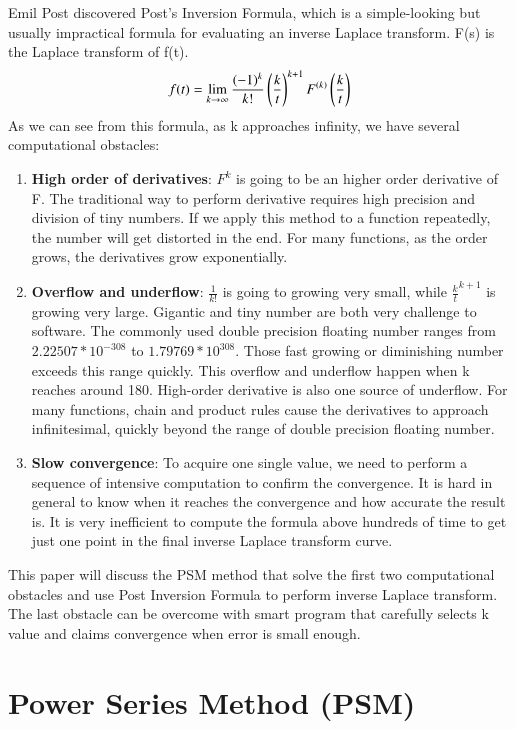 \documentclass[12pt]{article}
\begin{document}
Emil Post discovered Post's Inversion Formula, which is a simple-looking but usually impractical formula for evaluating an inverse Laplace transform. F(s) is the Laplace transform of f(t).
\begin{equation*}
f(t) = \lim_{k \rightarrow \infty}\frac{(-1)^{k}}{k!} \left(\frac{k}{t}\right)^{k+1}  F^{(k)} \left(\frac{k}{t}\right)
\end{equation*}
As we can see from this formula, as k approaches infinity, we have several computational obstacles:
\begin{enumerate}
\item
	\textbf{High order of derivatives}: $F^k$ is going to be an higher order derivative of F. The traditional way to perform derivative requires high precision and division of tiny numbers. If we apply this method to a function repeatedly, the number will get distorted in the end. For many functions, as the order grows, the derivatives grow exponentially.

\item 
	\textbf{Overflow and underflow}: $\frac{1}{k!}$  is going to growing very small, while $\frac{k}{t}^{k+1}$ is growing very large. Gigantic and tiny number are both very challenge to software. The commonly used double precision floating number ranges from $2.22507*10^{-308}$ to  $1.79769*10^{308}$. Those fast growing or diminishing number exceeds this range quickly. This overflow and underflow happen when k reaches around 180.
	High-order derivative is also one source of underflow. For many functions, chain and product rules cause the derivatives to approach infinitesimal, quickly beyond the range of double precision floating number.

\item
 	\textbf{Slow convergence}: To acquire one single value, we need to perform a sequence of intensive computation to confirm the convergence. It is hard in general to know when it reaches the convergence and how accurate the result is. It is very inefficient to compute the formula above hundreds of time to get just one point in the final inverse Laplace transform curve.
\end{enumerate}

This paper will discuss the PSM method that solve the first two computational obstacles and use Post Inversion Formula to perform inverse Laplace transform. The last obstacle can be overcome with smart program that carefully selects k value and claims convergence when error is small enough.

\section{Power Series Method (PSM)}
\end{document}
